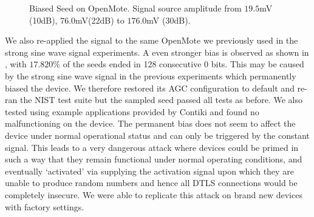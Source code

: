 \begin{figure}[!t]
\centering
{}
\hfil
{}
\caption{Biased Seed on OpenMote. Signal source amplitude from $19.5$mV (10dB), $76.0$mV(22dB) to $176.0$mV (30dB).}
\label{ConstantSignalBiased}
\end{figure}

We also re-applied the signal to the same OpenMote we previously used in the strong sine wave signal experiments. A even stronger bias is observed as shown in , with $17.820\%$ of the seeds ended in 128 consecutive $0$ bits. This may be caused by the strong sine wave signal in the previous experiments which permanently biased the device. We therefore restored its AGC configuration to default and re-ran the NIST test suite but the sampled seed passed all tests as before. We also tested using example applications provided by Contiki and found no malfunctioning on the device. The permanent bias does not seem to affect the device under normal operational status and can only be triggered by the constant signal. This leads to a very dangerous attack where devices could be primed in such a way that they remain functional under normal operating conditions, and eventually `activated' via supplying the activation signal upon which they are unable to produce random numbers and hence all DTLS connections would be completely insecure. We were able to replicate this attack on brand new devices with factory settings.

